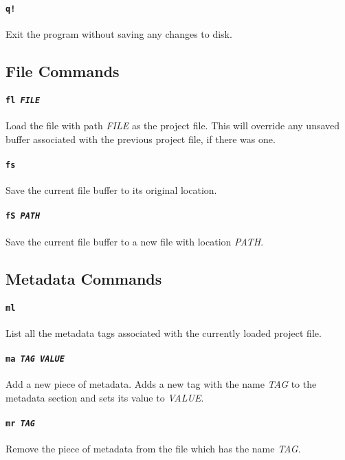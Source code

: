 \documentclass[a4paper]{article}
\begin{document}
\paragraph{\texttt{q!}}
Exit the program without saving any changes to disk.

\subsection{File Commands}

\paragraph{\texttt{fl \textit{FILE}}}
Load the file with path \textit{FILE} as the project file. This will override 
any unsaved buffer associated with the previous project file, if there was one.

\paragraph{\texttt{fs}}
Save the current file buffer to its original location.

\paragraph{\texttt{fS \textit{PATH}}}
Save the current file buffer to a new file with location \textit{PATH}.

\subsection{Metadata Commands}

\paragraph{\texttt{ml}}
List all the metadata tags associated with the currently loaded project
file.

\paragraph{\texttt{ma \textit{TAG VALUE}}}
Add a new piece of metadata. Adds a new tag with the name \textit{TAG}
to the metadata section and sets its value to \textit{VALUE}.

\paragraph{\texttt{mr \textit{TAG}}}
Remove the piece of metadata from the file which has the name \textit{TAG}.
\end{document}
